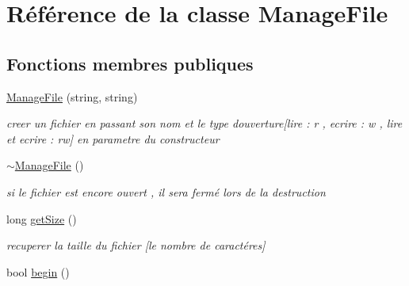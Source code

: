 \hypertarget{class_manage_file}{}\section{Référence de la classe Manage\+File}
\label{class_manage_file}
\subsection*{Fonctions membres publiques}
\begin{DoxyCompactItemize}
\item 
\hyperlink{class_manage_file_a4518fd47f265a8fdf7390f4e3a379f48}{Manage\+File} (string, string)\hypertarget{class_manage_file_a4518fd47f265a8fdf7390f4e3a379f48}{}\label{class_manage_file_a4518fd47f265a8fdf7390f4e3a379f48}

\begin{DoxyCompactList}\small\item\em creer un fichier en passant son nom et le type d\textquotesingle{}ouverture\mbox{[}lire \+: r , ecrire \+: w , lire et ecrire \+: rw\mbox{]} en parametre du constructeur \end{DoxyCompactList}\item 
\hyperlink{class_manage_file_a9e51cbd6892b25c9db2693a45b3b426a}{$\sim$\+Manage\+File} ()\hypertarget{class_manage_file_a9e51cbd6892b25c9db2693a45b3b426a}{}\label{class_manage_file_a9e51cbd6892b25c9db2693a45b3b426a}

\begin{DoxyCompactList}\small\item\em si le fichier est encore ouvert , il sera fermé lors de la destruction \end{DoxyCompactList}\item 
long \hyperlink{class_manage_file_abc31b87fa59ce977343415c6f31aed91}{get\+Size} ()\hypertarget{class_manage_file_abc31b87fa59ce977343415c6f31aed91}{}\label{class_manage_file_abc31b87fa59ce977343415c6f31aed91}

\begin{DoxyCompactList}\small\item\em recuperer la taille du fichier \mbox{[}le nombre de caractéres\mbox{]} \end{DoxyCompactList}\item 
bool \hyperlink{class_manage_file_ac779e525496629ade46b98614d81e232}{begin} ()\hypertarget{class_manage_file_ac779e525496629ade46b98614d81e232}{}\label{class_manage_file_ac779e525496629ade46b98614d81e232}


\end{DoxyCompactItemize}
